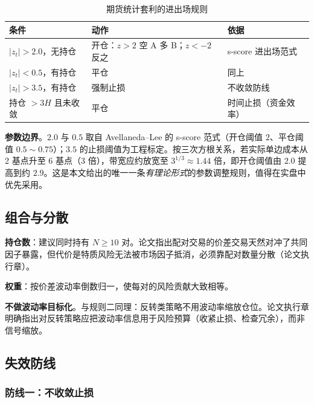 \begin{table}[htbp]
\centering\footnotesize
\caption{期货统计套利的进出场规则}\label{tab:band}
\begin{tabular}{@{}>{\raggedright\arraybackslash}p{2.4cm}>{\raggedright\arraybackslash}p{4.0cm}>{\raggedright\arraybackslash}p{7.6cm}@{}}
\toprule
\textbf{条件} & \textbf{动作} & \textbf{依据} \\
\midrule
$|z_t|>2.0$，无持仓 & 开仓：$z>2$ 空 A 多 B；$z<-2$ 反之 & s-score 进出场范式\cite{avellaneda2010} \\
$|z_t|<0.5$，有持仓 & 平仓 & 同上 \\
$|z_t|>3.5$，有持仓 & 强制止损 & 不收敛防线\cite{leungli2015} \\
持仓 $>3H$ 且未收敛 & 平仓 & 时间止损（资金效率） \\
\bottomrule
\end{tabular}
\end{table}

\textbf{参数边界}。$2.0$ 与 $0.5$ 取自 Avellaneda--Lee 的 s-score 范式（开仓阈值 $2$、平仓阈值 $0.5\sim0.75$）\cite{avellaneda2010}；$3.5$ 的止损阈值为工程标定。按三次方根关系，若实际单边成本从 2 基点升至 6 基点（3 倍），带宽应约放宽至 $3^{1/3}\approx1.44$ 倍，即开仓阈值由 $2.0$ 提高到约 $2.9$。这是本文给出的唯一一条\emph{有理论形式}的参数调整规则，值得在实盘中优先采用。

\subsection{组合与分散}

\textbf{持仓数}：建议同时持有 $N\ge10$ 对。论文指出配对交易的价差交易天然对冲了共同因子暴露，但代价是特质风险无法被市场因子抵消，必须靠配对数量分散（论文执行章）。

\textbf{权重}：按价差波动率倒数归一，使每对的风险贡献大致相等。

\textbf{不做波动率目标化}。与规则二同理：反转类策略不用波动率缩放仓位。论文执行章明确指出对反转策略应把波动率信息用于风险预算（收紧止损、检查冗余），而非信号缩放。

\subsection{失效防线}

\subsubsection*{防线一：不收敛止损}

